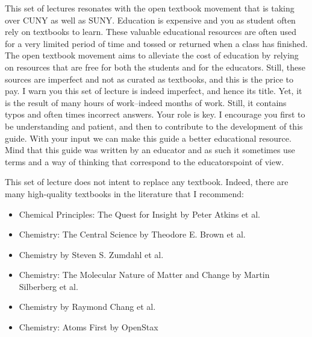 \documentclass[main.tex]{subfiles}
\begin{document}
\begin{fullwidth}
\begin{multicols*}{2}
This set of lectures resonates with the open textbook movement that is taking over CUNY as well as SUNY. Education is expensive and you as student often rely on textbooks to learn. These valuable educational resources are often used for a very limited period of time and tossed or returned when a class has finished. The open textbook movement aims to alleviate the cost of education by relying on resources that are free for both the students and for the educators. Still, these sources are imperfect and not as curated as textbooks, and this is the price to pay. I warn you this set of lecture is indeed imperfect, and hence its title. Yet, it is the result of many hours of work--indeed months of work. Still, it contains typos and often times incorrect answers. Your role is key. I encourage you first to be understanding and patient, and then to contribute to the development of this guide. With your input we can make this guide a better educational resource. Mind that this guide was written by an educator and as such it sometimes use terms and a way of thinking that correspond to the educators\textquotesingle point of view.

This set of lecture does not intent to replace any textbook. Indeed, there are many high-quality textbooks in the literature that I recommend:

\begin{small}\begin{itemize}[label=]
\setlength\itemsep{0.5em}
\item Chemical Principles: The Quest for Insight by Peter Atkins et al.
\item Chemistry: The Central Science by Theodore E. Brown et al.
\item Chemistry by Steven S. Zumdahl et al.
\item Chemistry: The Molecular Nature of Matter and Change by Martin Silberberg et al.
\item Chemistry by Raymond Chang et al.
\item Chemistry: Atoms First by OpenStax
\end{itemize}\end{small}


\end{multicols*}
\end{fullwidth}
\end{document}
